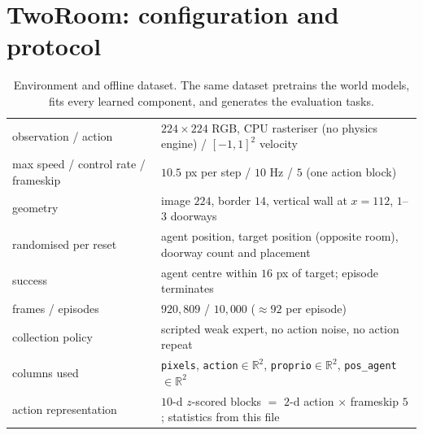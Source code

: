 
\appendix

\section{TwoRoom: configuration and protocol}
\label{app:tworoom}

\begin{table}[h]
\centering\small
\caption{Environment and offline dataset. The same dataset pretrains the
world models, fits every learned component, and generates the evaluation
tasks.}
\begin{tabular}{ll}
\toprule
observation / action & $224\times224$ RGB, CPU rasteriser (no physics engine) / $[-1,1]^2$ velocity \\
max speed / control rate / frameskip & $10.5$ px per step / $10$ Hz / $5$ (one action block) \\
geometry & image $224$, border $14$, vertical wall at $x{=}112$, $1$--$3$ doorways \\
randomised per reset & agent position, target position (opposite room), doorway count and placement \\
success & agent centre within $16$ px of target; episode terminates \\
\midrule
frames / episodes & $920{,}809$ / $10{,}000$ ($\approx\!92$ per episode) \\
collection policy & scripted weak expert, no action noise, no action repeat \\
columns used & \texttt{pixels}, \texttt{action}$\in\mathbb R^2$, \texttt{proprio}$\in\mathbb R^2$, \texttt{pos\_agent}$\in\mathbb R^2$ \\
action representation & $10$-d $z$-scored blocks $=$ $2$-d action $\times$ frameskip $5$; statistics from this file \\
\bottomrule
\end{tabular}
\end{table}

